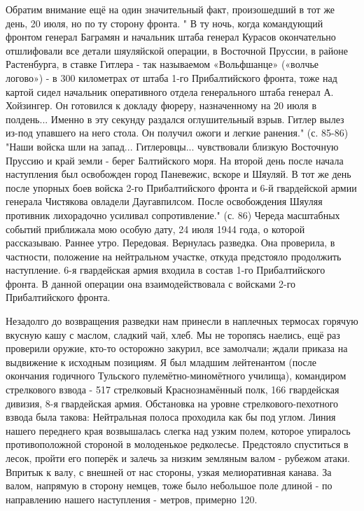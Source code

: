 \label{4-1}
Обратим внимание ещё на один значительный факт, произошедший в тот же день, 20 июля, но по ту сторону фронта. " В ту ночь, когда командующий фронтом генерал Баграмян и начальник штаба генерал Курасов окончательно отшлифовали все детали шяуляйской операции, в Восточной Пруссии, в районе Растенбурга, в ставке Гитлера - так называемом «Вольфшанце» («волчье логово») - в 300 километрах от штаба 1-го Прибалтийского фронта, тоже над картой сидел начальник оперативного отдела генерального штаба генерал А. Хойзингер. Он готовился к докладу фюреру, назначенному на 20 июля в полдень... Именно в эту секунду раздался оглушительный взрыв. Гитлер вылез из-под упавшего на него стола. Он получил ожоги и легкие ранения." (с. 85-86) "Наши войска шли на запад... Гитлеровцы... чувствовали близкую Восточную Пруссию и край земли - берег Балтийского моря. На второй день после начала наступления был освобожден город Паневежис, вскоре и Шяуляй. В тот же день после упорных боев войска 2-го Прибалтийского фронта и 6-й гвардейской армии генерала Чистякова овладели Даугавпилсом. После освобождения Шяуляя противник лихорадочно усиливал сопротивление." (с. 86) Череда масштабных событий приближала мою особую дату, 24 июля 1944 года, о которой рассказываю.
Раннее утро. Передовая. Вернулась разведка. Она проверила, в частности, положение на нейтральном участке, откуда предстояло продолжить наступление. 6-я гвардейская армия входила в состав 1-го Прибалтийского фронта. В данной операции она взаимодействовала с войсками 2-го Прибалтийского фронта.

\label{5-1}
Незадолго до возвращения разведки нам принесли в наплечных термосах горячую вкусную кашу с маслом, сладкий чай, хлеб. Мы не торопясь наелись, ещё раз проверили оружие, кто-то осторожно закурил, все замолчали; ждали приказа на выдвижение к исходным позициям. Я был младшим лейтенантом (после окончания годичного Тульского пулемётно-миномётного училища), командиром стрелкового взвода - 517 стрелковый Краснознамённый полк, 166 гвардейская дивизия, 8-я гвардейская армия. Обстановка на уровне стрелкового-пехотного взвода была такова: Нейтральная полоса проходила как бы под углом. Линия нашего переднего края возвышалась слегка над узким полем, которое упиралось противоположной стороной в молоденькое редколесье. Предстояло спуститься в лесок, пройти его поперёк и залечь за низким земляным валом - рубежом атаки. Впритык к валу, с внешней от нас стороны, узкая мелиоративная канава. За валом, напрямую в сторону немцев, тоже было небольшое поле длиной - по направлению нашего наступления - метров, примерно 120.

